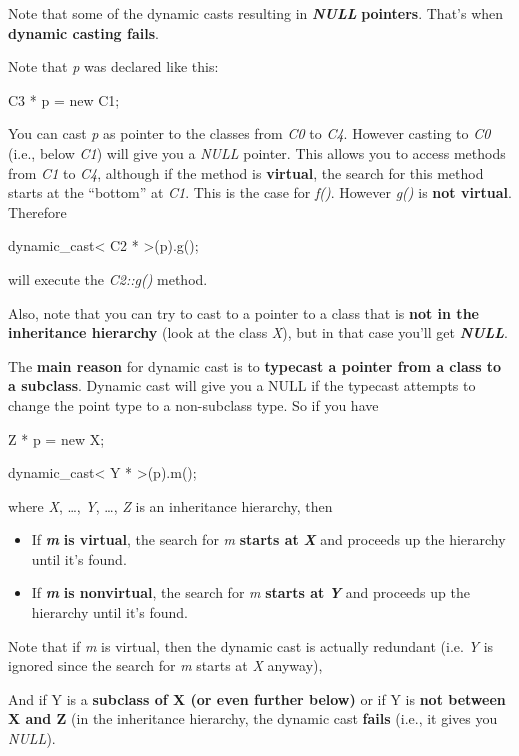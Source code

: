\documentclass[
]{article}
\providecommand{\tightlist}{%
  \setlength{\itemsep}{0pt}\setlength{\parskip}{0pt}}
\begin{document}
Note that some of the dynamic casts resulting in
\emph{\textbf{NULL}}\textbf{ pointers}. That's when \textbf{dynamic
casting fails}.

Note that \emph{p} was declared like this:

C3 * p = new C1;

You can cast \emph{p} as pointer to the classes from \emph{C0 }to
\emph{C4}. However casting to \emph{C0 }(i.e., below \emph{C1}) will
give you a \emph{NULL} pointer. This allows you to access methods from
\emph{C1} to \emph{C4}, although if the method is \textbf{virtual}, the
search for this method starts at the ``bottom'' at \emph{C1}. This is
the case for \emph{f()}. However \emph{g()} is \textbf{not virtual}.
Therefore

dynamic\_cast\textless{} C2 * \textgreater(p).g();

will execute the \emph{C2::g()} method.

Also, note that you can try to cast to a pointer to a class that is
\textbf{not in the inheritance hierarchy} (look at the class \emph{X}),
but in that case you'll get \emph{\textbf{NULL}}.

The \textbf{main reason} for dynamic cast is to \textbf{typecast a
pointer from a class to a subclass}. Dynamic cast will give you a NULL
if the typecast attempts to change the point type to a non-subclass
type. So if you have

Z * p = new X;

dynamic\_cast\textless{} Y * \textgreater(p).m();

where \emph{X}, \ldots, \emph{Y}, \ldots, \emph{Z} is an inheritance
hierarchy, then

\begin{itemize}
\tightlist
\item
  If \emph{\textbf{m}}\textbf{ is virtual}, the search for \emph{m}
  \textbf{starts at }\emph{\textbf{X}} and proceeds up the hierarchy
  until it's found.
\item
  If \emph{\textbf{m}}\textbf{ is nonvirtual}, the search for \emph{m}
  \textbf{starts at }\emph{\textbf{Y}} and proceeds up the hierarchy
  until it's found.
\end{itemize}

Note that if \emph{m} is virtual, then the dynamic cast is actually
redundant (i.e. \emph{Y} is ignored since the search for \emph{m} starts
at \emph{X} anyway),

And if Y is a \textbf{subclass of X (or even further below)} or if Y is
\textbf{not between X and Z} (in the inheritance hierarchy, the dynamic
cast \textbf{fails} (i.e., it gives you \emph{NULL}).
\end{document}
